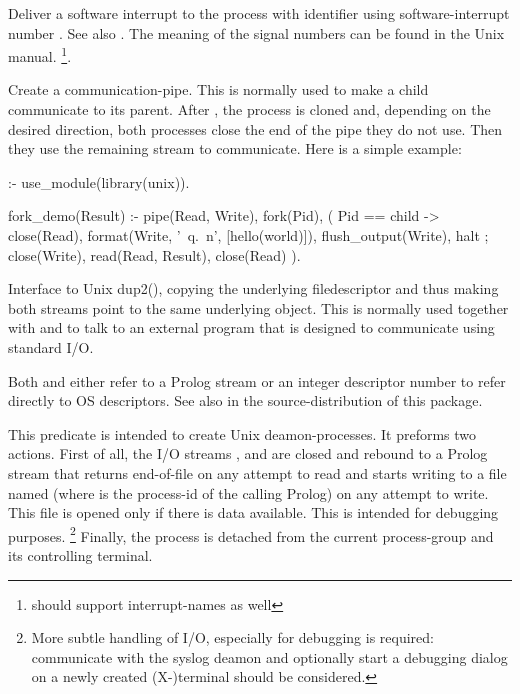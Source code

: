 \documentclass[11pt]{article}
\begin{document}
\begin{description}
Deliver a software interrupt to the process with identifier 
using software-interrupt number .  See also .
The meaning of the signal numbers can be found in the Unix manual.%
\footnote{ should support interrupt-names as well}.

Create a communication-pipe. This is normally used to make a child
communicate to its parent. After , the process is cloned and,
depending on the desired direction, both processes close the end of the
pipe they do not use. Then they use the remaining stream to communicate.
Here is a simple example:

\begin{code}
:- use_module(library(unix)).

fork_demo(Result) :-
        pipe(Read, Write),
        fork(Pid),
        (   Pid == child
        ->  close(Read),
            format(Write, '~q.~n',
                   [hello(world)]),
            flush_output(Write),
            halt
        ;   close(Write),
            read(Read, Result),
            close(Read)
        ).
\end{code}

\noindent
Interface to Unix dup2(), copying the underlying filedescriptor and thus
making both streams point to the same underlying object. This is
normally used together with  and  to talk to an external
program that is designed to communicate using standard I/O.

Both  and  either refer to a Prolog stream
or an integer descriptor number to refer directly to OS descriptors.
See also  in the source-distribution of this package.

This predicate is intended to create Unix deamon-processes. It preforms
two actions.  First of all, the I/O streams , 
 and  are closed and rebound to
a Prolog stream that returns end-of-file on any attempt to read and
starts writing to a file named  (where  is
the process-id of the calling Prolog) on any attempt
to write.  This file is opened only if there is data available.  This is
intended for debugging purposes.%
    \footnote{More subtle handling of I/O, especially for debugging is
	      required: communicate with the syslog deamon and
	      optionally start a debugging dialog on a newly created
	      (X-)terminal should be considered.}
Finally, the process is detached from the current process-group and its
controlling terminal.
\end{description}
\end{document}
